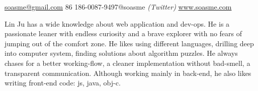 \documentclass[10pt,a4paper]{article} %
\begin{document}


\noindent\href{mailto:soasme@gmail.com}{soasme@gmail.com}\bull
\textsmaller{+}86 186-0087-9497\bull @soasme \textit{(Twitter)}\bull
\href{http://www.soasme.com}{www.soasme.com}\\ %
\spacedhrule{0.9em}{-0.4em} %



\vspace{-1.3em} %

\begin{multicols}{2}  %
  Lin Ju has a wide knowledge about web application and dev-ops. He is a passionate leaner with endless curiosity and a brave explorer with no fears of jumping out of the comfort zone. He likes using different languages, drilling deep into computer system, finding solutions about algorithm puzzles. He always chases for a better working-flow, a cleaner implementation without bad-smell, a transparent communication. Although working mainly in back-end, he also likes writing front-end code: js, java, obj-c.
\end{multicols}

\spacedhrule{0.5em}{-0.4em} %


\end{document}
